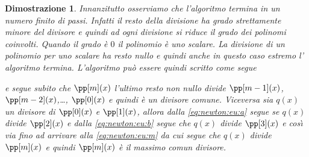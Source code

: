 \documentclass[twoside,10pt]{article}
\theoremstyle{plain}
\theoremstyle{nonumberplain}
\newtheorem{dimostrazione}{Dimostrazione}
\begin{document}
\begin{dimostrazione}
    Innanzitutto osserviamo che l'algoritmo termina in un numero
    finito di passi.  Infatti il resto della divisione ha grado
    strettamente minore del divisore e quindi ad ogni divisione si
    riduce il grado dei polinomi coinvolti.  Quando il grado \`e $0$
    il polinomio \`e uno scalare.  La divisione di un polinomio per
    uno scalare ha resto nullo e quindi anche in questo caso estremo
    l' algoritmo termina.  L'algoritmo pu\`o essere quindi scritto
    come segue
    e segue subito che $\pp[m](x)$ l'ultimo resto non nullo divide
    $\pp[m-1](x)$, $\pp[m-2](x)$,\ldots, $\pp[0](x)$ e quindi \`e un
    divisore comune.  Viceversa sia $q(x)$ un divisore di $\pp[0](x)$
    e $\pp[1](x)$, allora dalla \eqref{eq:newton:eu:a} segue se $q(x)$
    divide $\pp[2](x)$ e dalla \eqref{eq:newton:eu:b} segue che $q(x)$
    divide $\pp[3](x)$ e cos\`{\i} via fino ad arrivare alla
    \eqref{eq:newton:eu:m} da cui segue che $q(x)$ divide $\pp[m](x)$
    e quindi $\pp[m](x)$ \`e il massimo comun divisore.
\end{dimostrazione}
\end{document}
